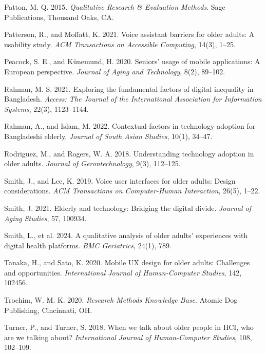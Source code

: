 \documentclass[acmlarge]{acmart}
\begin{document}
{\begin{thebibliography}{50}
Patton, M. Q. 2015. \textit{Qualitative Research \& Evaluation Methods}. Sage Publications, Thousand Oaks, CA.

Patterson, R., and Moffatt, K. 2021. Voice assistant barriers for older adults: A usability study. \textit{ACM Transactions on Accessible Computing}, 14(3), 1--25.

Peacock, S. E., and Künemund, H. 2020. Seniors’ usage of mobile applications: A European perspective. \textit{Journal of Aging and Technology}, 8(2), 89--102.

Rahman, M. S. 2021. Exploring the fundamental factors of digital inequality in Bangladesh. \textit{Access: The Journal of the International Association for Information Systems}, 22(3), 1123--1144.

Rahman, A., and Islam, M. 2022. Contextual factors in technology adoption for Bangladeshi elderly. \textit{Journal of South Asian Studies}, 10(1), 34--47.

Rodriguez, M., and Rogers, W. A. 2018. Understanding technology adoption in older adults. \textit{Journal of Gerontechnology}, 9(3), 112--125.

Smith, J., and Lee, K. 2019. Voice user interfaces for older adults: Design considerations. \textit{ACM Transactions on Computer-Human Interaction}, 26(5), 1--22.

Smith, J. 2021. Elderly and technology: Bridging the digital divide. \textit{Journal of Aging Studies}, 57, 100934.

Smith, L., et al. 2024. A qualitative analysis of older adults' experiences with digital health platforms. \textit{BMC Geriatrics}, 24(1), 789.

Tanaka, H., and Sato, K. 2020. Mobile UX design for older adults: Challenges and opportunities. \textit{International Journal of Human-Computer Studies}, 142, 102456.

Trochim, W. M. K. 2020. \textit{Research Methods Knowledge Base}. Atomic Dog Publishing, Cincinnati, OH.

Turner, P., and Turner, S. 2018. When we talk about older people in HCI, who are we talking about? \textit{International Journal of Human-Computer Studies}, 108, 102--109.


\end{thebibliography}}
\end{document}
